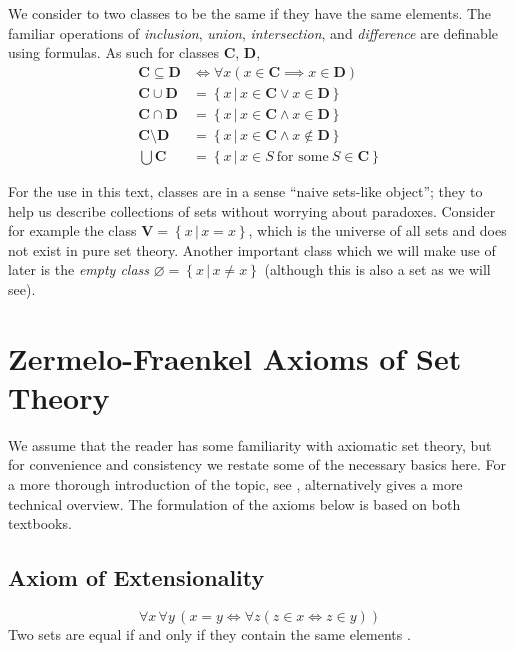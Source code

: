 \documentclass[../../main.tex]{subfiles}
\begin{document}
We consider to two classes to be the same if they have the same elements.
The familiar operations of \textit{inclusion}, \textit{union}, \textit{intersection}, and \textit{difference} are definable using formulas.
As such for classes $\mathbf{C}$, $\mathbf{D}$,
\begin{align*}
    \mathbf{C} \subseteq \mathbf{D} &\iff \forall x \left(x \in \mathbf{C} \implies x \in \mathbf{D}\right) \\
    \mathbf{C} \cup \mathbf{D} &= \left\{x \,\vert\, x \in \mathbf{C} \vee x \in \mathbf{D}\right\} \\
    \mathbf{C} \cap \mathbf{D} &= \left\{x \,\vert\, x \in \mathbf{C} \wedge x \in \mathbf{D}\right\} \\ 
    \mathbf{C} \setminus \mathbf{D} &= \left\{x \,\vert\, x \in \mathbf{C} \wedge x \not\in \mathbf{D}\right\} \\
    \bigcup \mathbf{C} &= \left\{x \,\vert\, x \in S \ \text{for some}\ S \in \mathbf{C}\right\}
\end{align*}\cite[pp.3-4]{Jec78}

For the use in this text, classes are in a sense ``naive sets-like object''; they to help us describe collections of sets without worrying about paradoxes.
Consider for example the class $\mathbf{V} = \left\{x \,\vert\, x=x\right\}$, which is the universe of all sets and does not exist in pure set theory.
Another important class which we will make use of later is the \textit{empty class} $\varnothing = \left\{x \,\vert\, x \neq x\right\}$ (although this is also a set as we will see).

\section{Zermelo-Fraenkel Axioms of Set Theory}
We assume that the reader has some familiarity with axiomatic set theory, but for convenience and consistency we restate some of the necessary basics here. %
For a more thorough introduction of the topic, see \cite[\S\S 4.3-4.5]{Gol17}, alternatively \cite[\S 1.1]{Jec78} gives a more technical overview.
The formulation of the axioms below is based on both textbooks.

\subsection{Axiom of Extensionality}\label{ZF1}
$$\forall x\, \forall y\, \left(x = y \iff \forall z \left(z \in x \iff z \in y\right) \right)$$
Two sets are equal if and only if they contain the same elements \cite[\S 4.3, p.76]{Gol17}.
\end{document}
